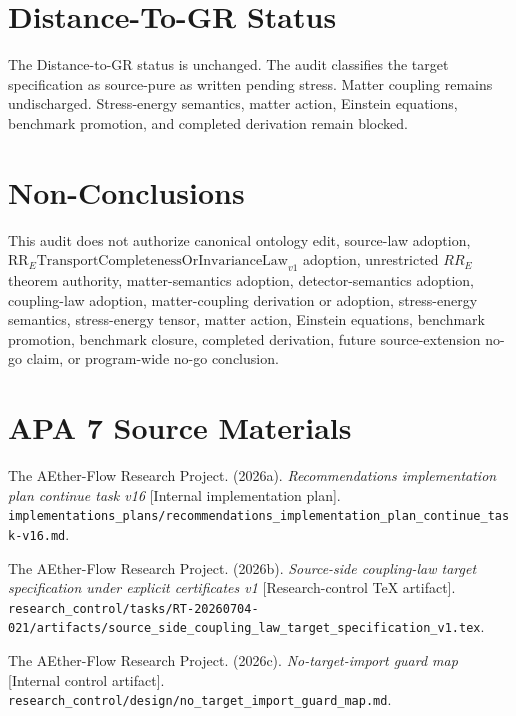 \documentclass[11pt]{article}
\begin{document}
\section{Distance-To-GR Status}

The Distance-to-GR status is unchanged. The audit classifies the target
specification as source-pure as written pending stress. Matter coupling
remains undischarged. Stress-energy semantics, matter action, Einstein
equations, benchmark promotion, and completed derivation remain blocked.

\section{Non-Conclusions}

This audit does not authorize canonical ontology edit, source-law adoption,
\(\mathrm{RR}_{E}\mathrm{TransportCompletenessOrInvarianceLaw}_{v1}\)
adoption, unrestricted \(RR_E\) theorem authority, matter-semantics adoption,
detector-semantics adoption, coupling-law adoption, matter-coupling derivation
or adoption, stress-energy semantics, stress-energy tensor, matter action,
Einstein equations, benchmark promotion, benchmark closure, completed
derivation, future source-extension no-go claim, or program-wide no-go
conclusion.

\section{APA 7 Source Materials}

The AEther-Flow Research Project. (2026a). \emph{Recommendations
implementation plan continue task v16} [Internal implementation plan].
\texttt{implementations\_plans/recommendations\_implementation\_plan\_continue\_task-v16.md}.

The AEther-Flow Research Project. (2026b). \emph{Source-side coupling-law
target specification under explicit certificates v1} [Research-control TeX
artifact].
\texttt{research\_control/tasks/RT-20260704-021/artifacts/source\_side\_coupling\_law\_target\_specification\_v1.tex}.

The AEther-Flow Research Project. (2026c). \emph{No-target-import guard map}
[Internal control artifact].
\texttt{research\_control/design/no\_target\_import\_guard\_map.md}.
\end{document}
